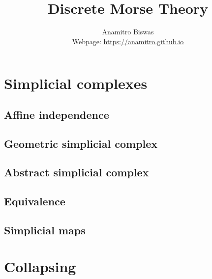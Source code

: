 \documentclass[a4paper,11pt, tikz]{article}
\begin{document}
\title{Discrete Morse Theory}
\author{Anamitro Biswas\\Webpage: \url{https://anamitro.github.io}}
\maketitle
\section{Simplicial complexes}
\subsection{Affine independence}
\subsection{Geometric simplicial complex}
\subsection{Abstract simplicial complex}
\subsection{Equivalence}
\subsection{Simplicial maps}
\section{Collapsing}
\end{document}
